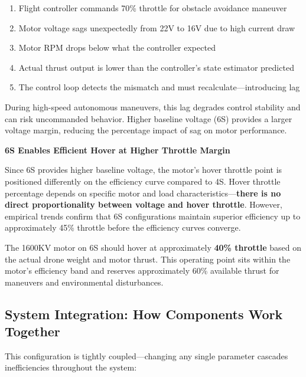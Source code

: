\begin{enumerate}
    \item Flight controller commands 70\% throttle for obstacle avoidance maneuver
    \item Motor voltage sags unexpectedly from 22V to 16V due to high current draw
    \item Motor RPM drops below what the controller expected
    \item Actual thrust output is lower than the controller's state estimator predicted
    \item The control loop detects the mismatch and must recalculate---introducing lag
\end{enumerate}

During high-speed autonomous maneuvers, this lag degrades control stability and can risk uncommanded behavior. Higher baseline voltage (6S) provides a larger voltage margin, reducing the percentage impact of sag on motor performance.\cite{bershadsky2016propulsion}

\textbf{6S Enables Efficient Hover at Higher Throttle Margin}

Since 6S provides higher baseline voltage, the motor's hover throttle point is positioned differently on the efficiency curve compared to 4S. Hover throttle percentage depends on specific motor and load characteristics---\textbf{there is no direct proportionality between voltage and hover throttle}. However, empirical trends confirm that 6S configurations maintain superior efficiency up to approximately 45\% throttle before the efficiency curves converge.\cite{hughes2013electric}

The 1600KV motor on 6S should hover at approximately \textbf{40\% throttle} based on the actual drone weight and motor thrust.\cite{bershadsky2016propulsion} This operating point sits within the motor's efficiency band and reserves approximately 60\% available thrust for maneuvers and environmental disturbances.

\subsection{System Integration: How Components Work Together}

This configuration is tightly coupled---changing any single parameter cascades inefficiencies throughout the system:

